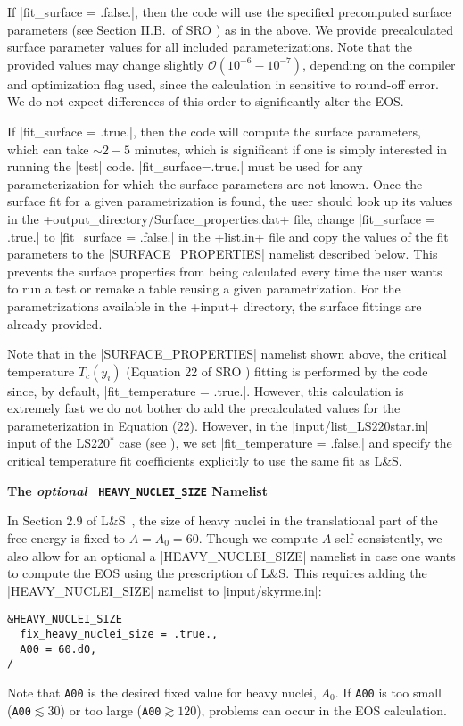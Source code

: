 \documentclass[letterpaper,11pt]{refart}
\newcommand{\LSn}{L\&S}
\begin{document}
If \verbprm|fit_surface = .false.|, then the code will use the specified
precomputed surface parameters (see Section II.B.\ of SRO
\cite{schneider:17}) as in the above. We provide precalculated surface
parameter values for all included parameterizations. Note that the
provided values may change slightly $\mathcal{O}(10^{-6} - 10^{-7})$,
depending on the compiler and optimization flag used, since the calculation
in sensitive to round-off error.  We do not
expect differences of this order to significantly alter the EOS.


If \verbprm|fit_surface = .true.|, then the code will compute the
surface parameters, which can take $\sim2 - 5$ minutes, which is
significant if one is simply interested in running the \verbexec|test|
code. \verbprm|fit_surface=.true.| must be used for any parameterization
for which the surface parameters are not known. 
Once the surface fit for a given parametrization is found, 
the user should look up its values in the 
\verbfile+output_directory/Surface_properties.dat+ file, change 
\verbprm|fit_surface = .true.|  to  \verbprm|fit_surface = .false.|
in the  \verbfile+list.in+ file and copy the values of the fit 
parameters to the  \verbnml|SURFACE_PROPERTIES|  namelist described below. 
This prevents the surface properties from being calculated every time 
the user wants to run a test or remake a table reusing a given parametrization.
For the parametrizations available in the  \verbfile+input+ directory, the 
surface fittings are already provided.



Note that in the \verbnml|SURFACE_PROPERTIES| namelist shown above,
the critical temperature $T_c(y_i)$ (Equation 22 of SRO
\cite{schneider:17}) fitting is performed by the code since, by
default, \verbprm|fit_temperature = .true.|. However, this calculation
is extremely fast we do not bother do add the precalculated values for
the parameterization in Equation (22).  However, in the
\verbfile|input/list_LS220star.in| input of the LS220$^*$ case (see
\cite{schneider:17}), we set \verbprm|fit_temperature = .false.| and
specify the critical temperature fit coefficients explicitly to use
the same fit as L\&S. 


\bigskip
\textbf{The \emph{optional} \texttt{\color{cyan} HEAVY\_NUCLEI\_SIZE}
  Namelist}



In Section 2.9 of L\&S~\cite{lattimer:91}, the size of heavy nuclei in
the translational part of the free energy is fixed to $A=A_0=60$.
Though we compute $A$ self-consistently, we also allow for an optional
a \verbnml|HEAVY_NUCLEI_SIZE| namelist in case one wants to compute
the EOS using the prescription of \LSn. This requires adding
the \verbnml|HEAVY_NUCLEI_SIZE| namelist to 
\verbfile|input/skyrme.in|:
{\color{cyan}
\begin{verbatim}
&HEAVY_NUCLEI_SIZE
  fix_heavy_nuclei_size = .true.,
  A00 = 60.d0,
/
\end{verbatim}}
Note that \verb+A00+ is the desired fixed value for heavy nuclei,
$A_0$.  If \verb+A00+ is too small (\verb+A00+$\lesssim30$) or too
large (\verb+A00+$\gtrsim120$), problems can occur in the EOS
calculation.
\end{document}
